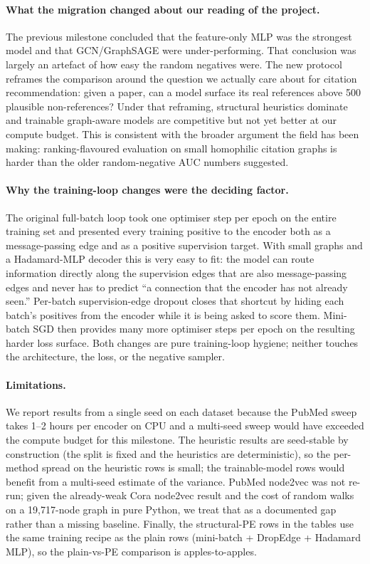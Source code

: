 \documentclass[10pt,a4paper]{article}
\begin{document}
\paragraph{What the migration changed about our reading of the project.}
The previous milestone concluded that the feature-only MLP was the
strongest model and that GCN/GraphSAGE were under-performing. That
conclusion was largely an artefact of how easy the random negatives
were. The new protocol reframes the comparison around the question we
actually care about for citation recommendation: given a paper, can a
model surface its real references above 500 plausible non-references?
Under that reframing, structural heuristics dominate and trainable
graph-aware models are competitive but not yet better at our compute
budget. This is consistent with the broader argument the field has
been making: ranking-flavoured evaluation on small homophilic citation
graphs is harder than the older random-negative AUC numbers suggested.

\paragraph{Why the training-loop changes were the deciding factor.}
The original full-batch loop took one optimiser step per epoch on the
entire training set and presented every training positive to the
encoder both as a message-passing edge and as a positive supervision
target. With small graphs and a Hadamard-MLP decoder this is very easy
to fit: the model can route information directly along the supervision
edges that are also message-passing edges and never has to predict
``a connection that the encoder has not already seen.'' Per-batch
supervision-edge dropout closes that shortcut by hiding each batch's
positives from the encoder while it is being asked to score them.
Mini-batch SGD then provides many more optimiser steps per epoch on
the resulting harder loss surface. Both changes are pure training-loop
hygiene; neither touches the architecture, the loss, or the negative
sampler.

\paragraph{Limitations.}
We report results from a single seed on each dataset because the
PubMed sweep takes 1--2 hours per encoder on CPU and a multi-seed
sweep would have exceeded the compute budget for this milestone. The
heuristic results are seed-stable by construction (the split is
fixed and the heuristics are deterministic), so the per-method spread
on the heuristic rows is small; the trainable-model rows would benefit
from a multi-seed estimate of the variance. PubMed node2vec was not
re-run; given the already-weak Cora node2vec result and the cost of
random walks on a 19{,}717-node graph in pure Python, we treat that as
a documented gap rather than a missing baseline. Finally, the
structural-PE rows in the tables use the same training recipe as the
plain rows (mini-batch + DropEdge + Hadamard MLP), so the
plain-vs-PE comparison is apples-to-apples.
\end{document}
